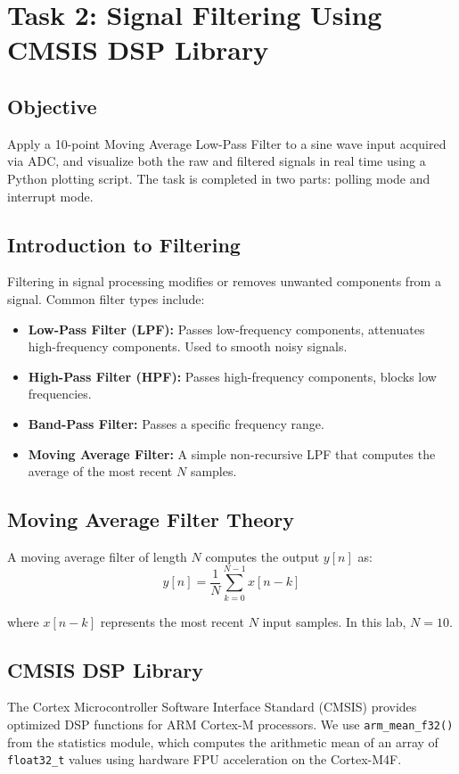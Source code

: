 \documentclass[12pt,a4paper]{article}
\begin{document}
\section{Task 2: Signal Filtering Using CMSIS DSP Library}

\subsection{Objective}
Apply a 10-point Moving Average Low-Pass Filter to a sine wave input acquired via ADC, and visualize both the raw and filtered signals in real time using a Python plotting script. The task is completed in two parts: polling mode and interrupt mode.

\subsection{Introduction to Filtering}
Filtering in signal processing modifies or removes unwanted components from a signal. Common filter types include:
\begin{itemize}
    \item \textbf{Low-Pass Filter (LPF):} Passes low-frequency components, attenuates high-frequency components. Used to smooth noisy signals.
    \item \textbf{High-Pass Filter (HPF):} Passes high-frequency components, blocks low frequencies.
    \item \textbf{Band-Pass Filter:} Passes a specific frequency range.
    \item \textbf{Moving Average Filter:} A simple non-recursive LPF that computes the average of the most recent $N$ samples.
\end{itemize}

\subsection{Moving Average Filter Theory}

A moving average filter of length $N$ computes the output $y[n]$ as:
\begin{equation}
    y[n] = \frac{1}{N} \sum_{k=0}^{N-1} x[n-k]
\end{equation}

where $x[n-k]$ represents the most recent $N$ input samples. In this lab, $N = 10$.

\subsection{CMSIS DSP Library}
The Cortex Microcontroller Software Interface Standard (CMSIS) provides optimized DSP functions for ARM Cortex-M processors. We use \texttt{arm\_mean\_f32()} from the statistics module, which computes the arithmetic mean of an array of \texttt{float32\_t} values using hardware FPU acceleration on the Cortex-M4F.
\end{document}
